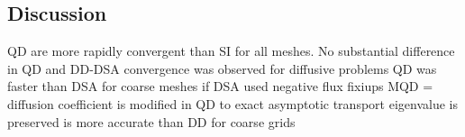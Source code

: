 \documentclass{report}
\begin{document}
\subsection{Discussion}
\begin{outline}
 \1 QD are more rapidly convergent than SI for all meshes. 
 \1 No substantial difference in QD and DD-DSA convergence was observed for diffusive problems
 \1 QD was faster than DSA for coarse meshes
   \2 if DSA used negative flux fixiups
 \1 MQD = diffusion coefficient is modified in QD to exact asymptotic transport eigenvalue is preserved
   \2 is more accurate than DD for coarse grids
\end{outline}
\end{document}
